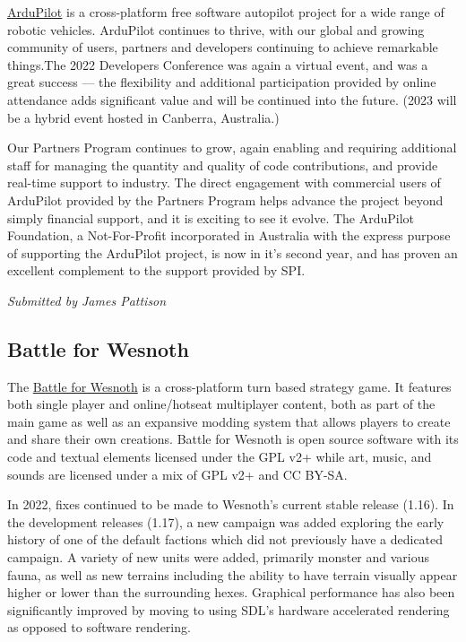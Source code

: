 \documentclass[a4paper]{report}
\begin{document}
\href{https://ardupilot.org/}{ArduPilot} is a cross-platform free software autopilot project for a wide range of robotic vehicles. ArduPilot continues to thrive, with our global and growing community of users, partners and developers continuing to achieve remarkable things.The 2022 Developers Conference was again a virtual event, and was a great success --- the flexibility and additional participation provided by online attendance adds significant value and will be continued into the future. (2023 will be a hybrid event hosted in Canberra, Australia.)

Our Partners Program continues to grow, again enabling and requiring additional staff for managing the quantity and quality of code contributions, and provide real-time support to industry. The direct engagement with commercial users of ArduPilot provided by the Partners Program helps advance the project beyond simply financial support, and it is exciting to see it evolve.  The ArduPilot Foundation, a Not-For-Profit incorporated in Australia with the express purpose of supporting the ArduPilot project, is now in it's second year, and has proven an excellent complement to the support provided by SPI.

{\em Submitted by James Pattison}

\subsection{Battle for Wesnoth}

The \href{https://www.wesnoth.org/}{Battle for Wesnoth} is a cross-platform turn based strategy game. It features both single player and online/hotseat multiplayer content, both as part of the main game as well as an expansive modding system that allows players to create and share their own creations. Battle for Wesnoth is open source software with its code and textual elements licensed under the GPL v2+ while art, music, and sounds are licensed under a mix of GPL v2+ and CC BY-SA.

In 2022, fixes continued to be made to Wesnoth's current stable release (1.16). In the development releases (1.17), a new campaign was added exploring the early history of one of the default factions which did not previously have a dedicated campaign. A variety of new units were added, primarily monster and various fauna, as well as new terrains including the ability to have terrain visually appear higher or lower than the surrounding hexes. Graphical performance has also been significantly improved by moving to using SDL's hardware accelerated rendering as opposed to software rendering.
\end{document}
